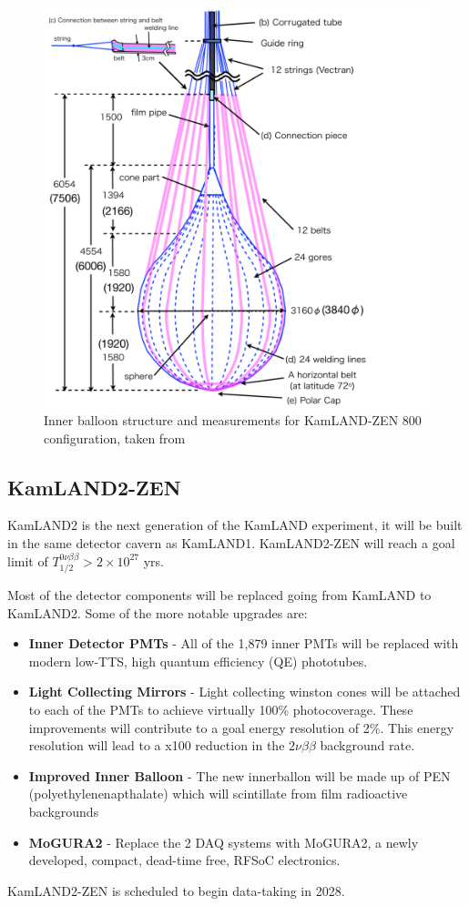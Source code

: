 \begin{figure}[htb]
	\centering
	\includegraphics[scale=0.5]{ballonstructure.png}
	\caption{Inner balloon structure and measurements for KamLAND-ZEN 800 configuration, taken from \cite{ozaki_phd}}
	\label{fig:balloon_structure}
\end{figure}

\subsection{KamLAND2-ZEN}
KamLAND2 is the next generation of the KamLAND experiment, it will be built in the same detector cavern as KamLAND1. KamLAND2-ZEN will reach a goal limit of $T_{1/2}^{0\nu\beta\beta}>2\times 10^{27}$ yrs.

Most of the detector components will be replaced going from KamLAND to KamLAND2. Some of the more notable upgrades are:
\begin{itemize}
	\item \textbf{Inner Detector PMTs} - All of the 1,879 inner PMTs will be replaced with modern low-TTS, high quantum efficiency (QE) phototubes. 
	\item \textbf{Light Collecting Mirrors} - Light collecting winston cones will be attached to each of the PMTs to achieve virtually 100\% photocoverage. These improvements will contribute to a goal energy resolution of 2\%. This energy resolution will lead to a x100 reduction in the $2\nu\beta\beta$ background rate.
	\item \textbf{Improved Inner Balloon} - The new innerballon will be made up of PEN (polyethylenenapthalate) which will scintillate from film radioactive backgrounds
	\item \textbf{MoGURA2} - Replace the 2 DAQ systems with MoGURA2, a newly developed, compact, dead-time free, RFSoC electronics.
\end{itemize}
KamLAND2-ZEN is scheduled to begin data-taking in 2028.

